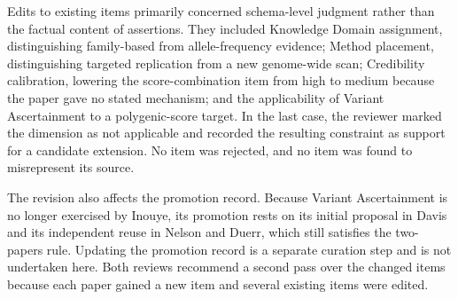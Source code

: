 Edits to existing items primarily concerned schema-level judgment rather than
the factual content of assertions. They included Knowledge Domain assignment,
distinguishing family-based from allele-frequency evidence; Method placement,
distinguishing targeted replication from a new genome-wide scan; Credibility
calibration, lowering the score-combination item from high to medium because
the paper gave no stated mechanism; and the applicability of Variant
Ascertainment to a polygenic-score target. In the last case, the reviewer
marked the dimension as not applicable and recorded the resulting constraint
as support for a candidate extension. No item was rejected, and no item was
found to misrepresent its source.

The revision also affects the promotion record. Because Variant Ascertainment
is no longer exercised by Inouye, its promotion rests on its initial proposal
in Davis and its independent reuse in Nelson and Duerr, which still satisfies
the two-papers rule. Updating the promotion record is a separate curation
step and is not undertaken here. Both reviews recommend a second pass over
the changed items because each paper gained a new item and several existing
items were edited.
